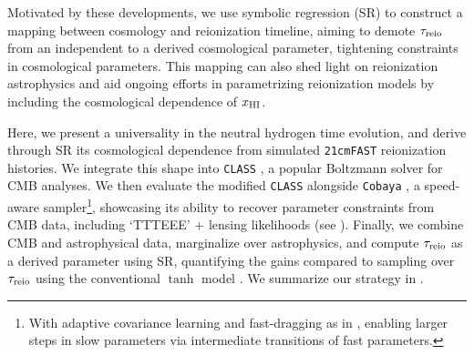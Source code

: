 Motivated by these developments, we use symbolic regression (SR)
\cite{Cranmer2023} to construct a mapping between cosmology and
reionization timeline, aiming to demote $\tau_{\mathrm{reio}}$ from an independent
to a derived cosmological parameter, tightening constraints 
in cosmological parameters. This mapping can also
shed light on reionization astrophysics and aid ongoing efforts in 
parametrizing reionization models 
\cite{Trac2018,Trac2022,Paoletti2024} by including the cosmological
dependence of $x_{\mathrm{HI}}$.

Here, we present a universality in the neutral hydrogen time evolution,
and derive through SR its cosmological dependence from simulated
\texttt{21cmFAST} \cite{MesingerEtAl2011,Murray2020} reionization histories.
We integrate this shape into \texttt{CLASS} \cite{Blas2011}, a popular
Boltzmann solver for CMB analyses.
We then evaluate the modified \texttt{CLASS} alongside \texttt{Cobaya}
\cite{Torrado2020}, a speed-aware sampler\cite{Lewis2002,
Lewis2013}\footnote{With adaptive covariance learning and fast-dragging
as in \cite{Neal2005}, enabling larger steps in slow parameters via
intermediate transitions of fast parameters.}, showcasing its ability to
recover parameter constraints from CMB data, including `TTTEEE' +
lensing likelihoods \cite{Planck2020c, Planck2020d} (see ).
Finally, we combine CMB and astrophysical data, marginalize over 
astrophysics, and compute $\tau_{\mathrm{reio}}$ as
a derived parameter using SR, quantifying the gains
compared to sampling over $\tau_{\mathrm{reio}}$ using the conventional $\tanh$
model \cite{Lewis2008}.
We summarize our strategy in .

